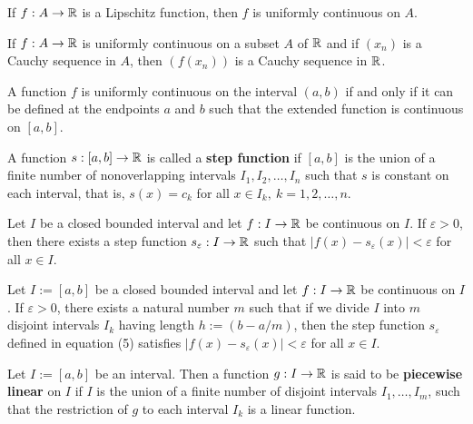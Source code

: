 \begin{theorem}
	If $f:A \rightarrow \mathbb{R}$ is a Lipschitz function, then $f$ is uniformly continuous on $A$.
\end{theorem}

\begin{theorem}
	If $f:A \rightarrow \mathbb{R}$ is uniformly continuous on a subset $A$ of $\mathbb{R}$ and if $(x_n)$ is a Cauchy sequence in $A$, then $(f(x_n))$ is a Cauchy sequence in $\mathbb{R}$.
\end{theorem}

\begin{theorem}
	A function $f$ is uniformly continuous on the interval $(a,b)$ if and only if it can be defined at the endpoints $a$ and $b$ such that the extended function is continuous on $[a,b]$.
\end{theorem}

\begin{definition}
	A function $s:[a,b] \rightarrow \mathbb{R}$ is called a \textbf{step function} if $[a,b]$ is the union of a finite number of nonoverlapping intervals $I_1, I_2, \dots, I_n$ such that $s$ is constant on each interval, that is, $s(x)=c_k$ for all $x \in I_k,\ k=1,2, \dots, n$.
\end{definition}

\begin{theorem}
	Let $I$ be a closed bounded interval and let $f:I \rightarrow \mathbb{R}$ be continuous on $I$. If $\varepsilon > 0$, then there exists a step function $s_\varepsilon : I \rightarrow \mathbb{R}$ such that $|f(x) - s_\varepsilon(x)| < \varepsilon$ for all $x \in I$.
\end{theorem}

\begin{corollary}
	Let $I:=[a,b]$ be a closed bounded interval and let $f: I \rightarrow \mathbb{R}$ be continuous on $I$. If $\varepsilon > 0$, there exists a natural number $m$ such that if we divide $I$ into $m$ disjoint intervals $I_k$ having length $h:= (b-a /m)$, then the step function $s_\varepsilon$ defined in equation (5) satisfies $|f(x) - s_\varepsilon (x)| < \varepsilon$ for all $x \in I$.
\end{corollary}

\begin{definition}
	Let $I:= [a,b]$ be an interval. Then a function $g:I \rightarrow \mathbb{R}$ is said to be \textbf{piecewise linear} on $I$ if $I$ is the union of a finite number of disjoint intervals $I_1, \dots, I_m$, such that the restriction of $g$ to each interval $I_k$ is a linear function.
\end{definition}

